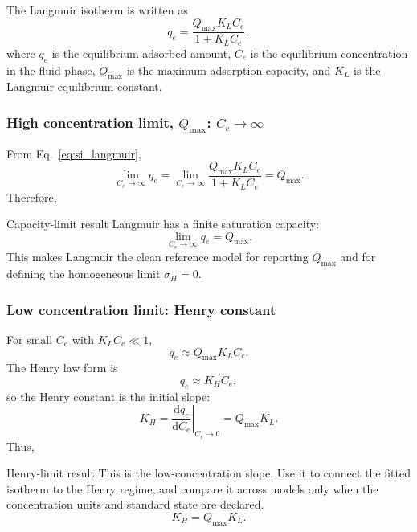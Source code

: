\documentclass[journal=jacsat,manuscript=article]{achemso}
\begin{document}
The Langmuir isotherm is written as
\begin{equation}
	q_e = \frac{Q_{\max} K_L C_e}{1 + K_L C_e},
	\label{eq:si_langmuir}
\end{equation}
where \(q_e\) is the equilibrium adsorbed amount, \(C_e\) is the
equilibrium concentration in the fluid phase, \(Q_{\max}\) is the maximum
adsorption capacity, and \(K_L\) is the Langmuir equilibrium constant.

\subsubsection{High concentration limit, \(Q_{\max}\): \(C_e \to \infty\)}

From Eq.~\eqref{eq:si_langmuir},
\begin{equation}
	\lim_{C_e \to \infty} q_e
	= \lim_{C_e \to \infty}
	\frac{Q_{\max} K_L C_e}{1 + K_L C_e}
	= Q_{\max}.
\end{equation}
Therefore,
\begin{greenbox}{Capacity-limit result}
	Langmuir has a finite saturation capacity:
	\begin{equation}
		\lim_{C_e \to \infty} q_e = Q_{\max}.
	\end{equation}
	This makes Langmuir the clean reference model for reporting \(Q_{\max}\)
	and for defining the homogeneous limit \(\sigma_H=0\).
\end{greenbox}

\subsubsection{Low concentration limit: Henry constant}

For small \(C_e\) with \(K_L C_e \ll 1\),
\begin{equation}
	q_e \approx Q_{\max} K_L C_e.
\end{equation}
The Henry law form is
\begin{equation}
	q_e \approx K_H C_e,
	\label{eq:si_henry}
\end{equation}
so the Henry constant is the initial slope:
\begin{equation}
	K_H = \left.\frac{\mathrm{d}q_e}{\mathrm{d}C_e}\right|_{C_e \to 0}
	= Q_{\max} K_L.
\end{equation}
Thus,
\begin{greenbox}{Henry-limit result}
	This is the low-concentration slope. Use it to connect the fitted isotherm to the Henry regime, and compare it across models only when the concentration units and standard state are declared.
\begin{equation}
	K_H = Q_{\max} K_L.
\end{equation}
\end{greenbox}
\end{document}
